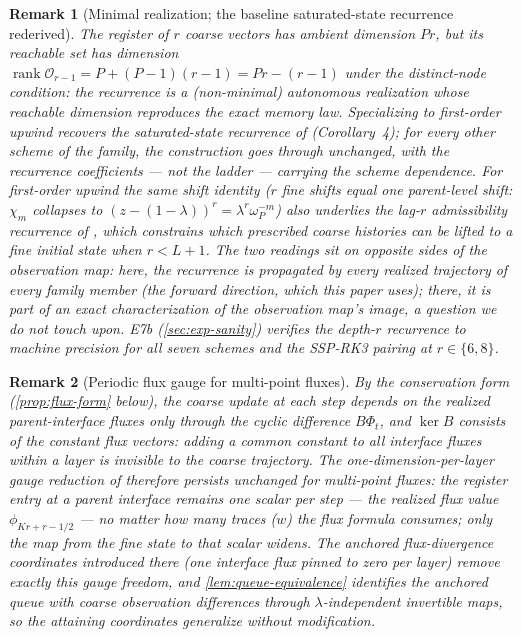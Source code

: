 \documentclass[pdflatex,sn-mathphys-num]{sn-jnl}%
\theoremstyle{thmstyleone}%
\theoremstyle{thmstyletwo}%
\newtheorem{remark}{Remark}%
\theoremstyle{thmstylethree}%
\DeclareMathOperator{\rank}{rank}
\begin{document}
\begin{remark}[Minimal realization; the baseline saturated-state recurrence rederived]\label{rem:saturated-state}
The register of $r$ coarse vectors has ambient dimension $Pr$, but its reachable set has dimension $\rank\mathcal O_{r-1}=P+(P-1)(r-1)=Pr-(r-1)$ under the distinct-node condition: the recurrence is a (non-minimal) autonomous realization whose reachable dimension reproduces the exact memory law.
Specializing to first-order upwind recovers the saturated-state recurrence of \cite{PolemitisChristakisDrikakis2026FVerasure} (Corollary~4); for every other scheme of the family, the construction goes through unchanged, with the recurrence coefficients --- not the ladder --- carrying the scheme dependence.
For first-order upwind the same shift identity ($r$ fine shifts equal one parent-level shift: $\chi_m$ collapses to $(z-(1-\lambda))^{r}=\lambda^{r}\omega_P^{-m}$) also underlies the lag-$r$ \emph{admissibility} recurrence of \cite{PolemitisChristakisDrikakis2026lifting}, which constrains which prescribed coarse histories can be lifted to a fine initial state when $r<L+1$.
The two readings sit on opposite sides of the observation map: here, the recurrence is propagated by every realized trajectory of every family member (the forward direction, which this paper uses); there, it is part of an exact characterization of the observation map's image, a question we do not touch upon.
E7b (\cref{sec:exp-sanity}) verifies the depth-$r$ recurrence to machine precision for all seven schemes and the SSP-RK3 pairing at $r\in\{6,8\}$.
\end{remark}

\begin{remark}[Periodic flux gauge for multi-point fluxes]\label{rem:flux-gauge}
By the conservation form (\cref{prop:flux-form} below), the coarse update at each step depends on the realized parent-interface fluxes only through the cyclic difference $B\Phi_t$, and $\ker B$ consists of the constant flux vectors: adding a common constant to all interface fluxes within a layer is invisible to the coarse trajectory.
The one-dimension-per-layer gauge reduction of \cite{PolemitisChristakisDrikakis2026FVerasure} therefore persists unchanged for multi-point fluxes: the register entry at a parent interface remains one scalar per step --- the \emph{realized} flux value $\phi_{Kr+r-1/2}$ --- no matter how many traces ($w$) the flux formula consumes; only the map from the fine state to that scalar widens.
The anchored flux-divergence coordinates introduced there (one interface flux pinned to zero per layer) remove exactly this gauge freedom, and \cref{lem:queue-equivalence} identifies the anchored queue with coarse observation differences through $\lambda$-independent invertible maps, so the attaining coordinates generalize without modification.
\end{remark}
\end{document}
